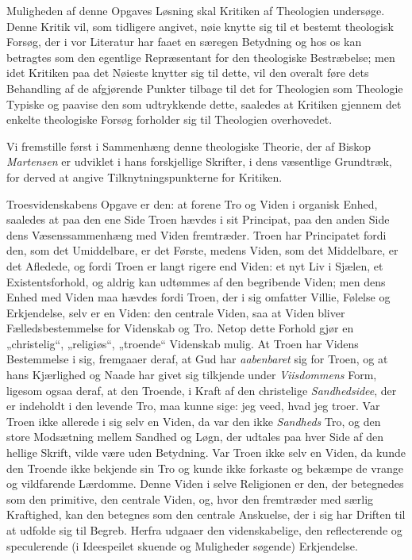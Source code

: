 \documentclass[12pt,a4paper]{book}
\newcommand{\opage}[1]{\marginnote{\footnotesize\textit{[#1]}}}
\begin{document}
Muligheden af denne Opgaves Løsning skal Kritiken af Theologien undersøge. Denne
Kritik vil, som tidligere angivet, nøie knytte sig til et bestemt theologisk
Forsøg, der i vor Literatur har faaet en særegen Betydning og hos os kan betragtes
som den egentlige Repræsentant for den theologiske Bestræbelse; men idet Kritiken
paa det Nøieste knytter sig til dette, vil den overalt føre dets Behandling af de
afgjørende Punkter tilbage til det for Theologien som Theologie Typiske og paavise
den som udtrykkende dette, saaledes at Kritiken gjennem det enkelte theologiske
Forsøg forholder sig til Theologien overhovedet.

Vi fremstille først i Sammenhæng denne theologiske Theorie, der af Biskop \emph{Martensen} er udviklet i hans forskjellige Skrifter, i dens væsentlige Grundtræk,
for derved at angive Tilknytningspunkterne for Kritiken.

Troesvidenskabens Opgave er den: at forene Tro og Viden i organisk Enhed,
saaledes at paa den ene Side Troen hævdes i sit Principat, paa den anden Side dens
Væsenssammenhæng med Viden fremtræder. Troen har Principatet fordi den, som det
Umiddelbare, er det Første, medens Viden, som det Middelbare, er det Afledede, og
fordi Troen er langt rigere end Viden: et nyt Liv i Sjælen, et Existentsforhold,
og aldrig kan udtømmes af den begribende Viden; men dens Enhed med Viden maa
hævdes fordi Troen, der i sig omfatter Villie, Følelse og Erkjendelse, selv er en Viden: den centrale Viden, saa at Viden bliver Fælledsbestemmelse for Videnskab og
Tro. Netop dette Forhold gjør en „christelig“, „religiøs“, „troende“ Videnskab
mulig. At Troen har Videns Bestemmelse i sig, fremgaaer deraf, at Gud har \emph{aabenbaret} sig for Troen, og at hans Kjærlighed og Naade har givet sig tilkjende
under \emph{Viisdommens} Form, ligesom ogsaa deraf, at den Troende, i Kraft af den
christelige \emph{Sandhedsidee}, der er \opage{45}indeholdt i den levende Tro, maa kunne sige: jeg
veed, hvad jeg troer. Var Troen ikke allerede i sig selv en Viden, da var den ikke
\emph{Sandheds} Tro, og den store Modsætning mellem Sandhed og Løgn, der udtales
paa hver Side af den hellige Skrift, vilde være uden Betydning. Var Troen ikke
selv en Viden, da kunde den Troende ikke bekjende sin Tro og kunde ikke forkaste
og bekæmpe de vrange og vildfarende Lærdomme. Denne Viden i selve Religionen er
den, der betegnedes som den primitive, den centrale Viden, og, hvor den
fremtræder med særlig Kraftighed, kan den betegnes som den centrale Anskuelse, der
i sig har Driften til at udfolde sig til Begreb. Herfra udgaaer den
videnskabelige, den reflecterende og speculerende (i Ideespeilet skuende og
Muligheder søgende) Erkjendelse.
\end{document}
